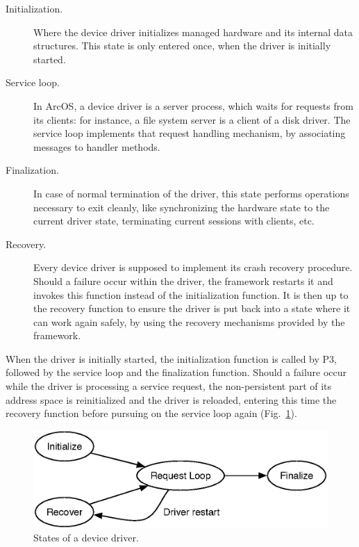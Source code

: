 \documentclass[times, 10pt, twocolumn]{article}
\begin{document}
\begin{description}
\item[Initialization.]
Where the device driver initializes managed hardware and its internal data structures. This state is only entered once, when the driver is initially started.

\item[Service loop.]
In ArcOS, a device driver is a server process, which waits for requests from its clients: for instance, a file system server is a client of a disk driver. The service loop implements that request handling mechanism, by associating messages to handler methods.

\item[Finalization.]
In case of normal termination of the driver, this state performs operations necessary to exit cleanly, like synchronizing the hardware state to the current driver state, terminating current sessions with clients, etc. 

\item[Recovery.]
Every device driver is supposed to implement its crash recovery procedure. Should a failure occur within the driver, the framework restarts it and invokes this function instead of the initialization function. It is then up to the recovery function to ensure the driver is put back into a state where it can work again safely, by using the recovery mechanisms provided by the framework.
\end{description}

When the driver is initially started, the initialization function is called by P3, followed by the service loop and the finalization function. Should a failure occur while the driver is processing a service request, the non-persistent part of its address space is reinitialized and the driver is reloaded, entering this time the recovery function before pursuing on the service loop again (Fig.~\ref{fig:driverstatemachine}).

\begin{figure}[ht]
\centering
\includegraphics[scale=0.5]{figures/driverstatemachine}
\caption{States of a device driver.}
\label{fig:driverstatemachine}
\end{figure}
\end{document}
